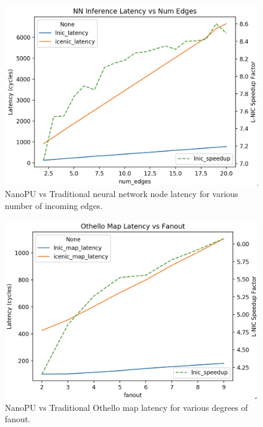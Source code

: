 \begin{figure}
  \includegraphics[width=\linewidth]{./figures/nn-inference-latency}
  \caption{NanoPU vs Traditional neural network node latency for various number of incoming edges.}
  \label{fig:nn_latency}
\end{figure}

\begin{figure}
  \includegraphics[width=\linewidth]{./figures/othello-map-latency}
  \caption{NanoPU vs Traditional Othello map latency for various degrees of fanout.}
  \label{fig:othello_map_latency}
\end{figure}

